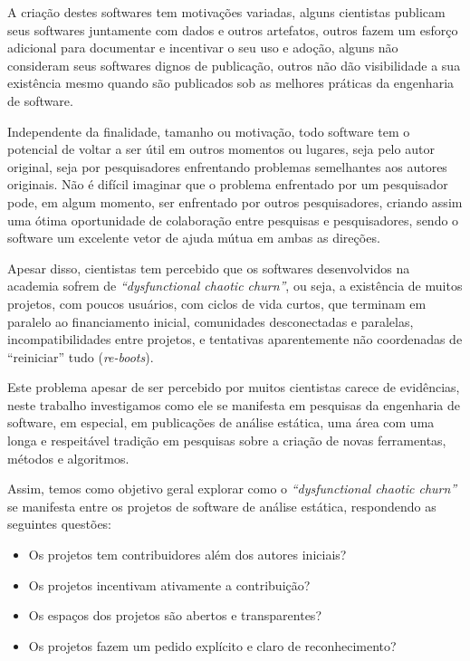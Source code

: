 A criação destes softwares tem motivações variadas, alguns cientistas publicam
seus softwares juntamente com dados e outros artefatos, outros fazem um esforço
adicional para documentar e incentivar o seu uso e adoção, alguns não
consideram seus softwares dignos de publicação, outros não dão visibilidade a
sua existência mesmo quando são publicados sob as melhores práticas da
engenharia de software.

Independente da finalidade, tamanho ou motivação, todo software tem o potencial
de voltar a ser útil em outros momentos ou lugares, seja pelo autor original,
seja por pesquisadores enfrentando problemas semelhantes aos autores originais.
Não é difícil imaginar que o problema enfrentado por um pesquisador pode, em
algum momento, ser enfrentado por outros pesquisadores, criando assim uma ótima
oportunidade de colaboração entre pesquisas e pesquisadores, sendo o software
um excelente vetor de ajuda mútua em ambas as direções.

Apesar disso, cientistas tem percebido que os softwares desenvolvidos na
academia sofrem de {\it ``dysfunctional chaotic churn''}, ou seja, a existência
de muitos projetos, com poucos usuários, com ciclos de vida curtos, que
terminam em paralelo ao financiamento inicial, comunidades desconectadas e
paralelas, incompatibilidades entre projetos, e tentativas aparentemente não
coordenadas de ``reiniciar'' tudo ({\it re-boots}).


Este problema apesar de ser percebido por muitos cientistas carece de
evidências, neste trabalho investigamos como ele se manifesta em pesquisas da
engenharia de software, em especial, em publicações de análise estática, uma
área com uma longa e respeitável tradição em pesquisas sobre a criação de novas
ferramentas, métodos e algoritmos.

Assim, temos como objetivo geral explorar como o {\it ``dysfunctional chaotic
churn''} se manifesta entre os projetos de software de análise estática,
respondendo as seguintes questões:

\begin{itemize}
  \item Os projetos tem contribuidores além dos autores iniciais?
  \item Os projetos incentivam ativamente a contribuição?
  \item Os espaços dos projetos são abertos e transparentes?
  \item Os projetos fazem um pedido explícito e claro de reconhecimento?
\end{itemize}

